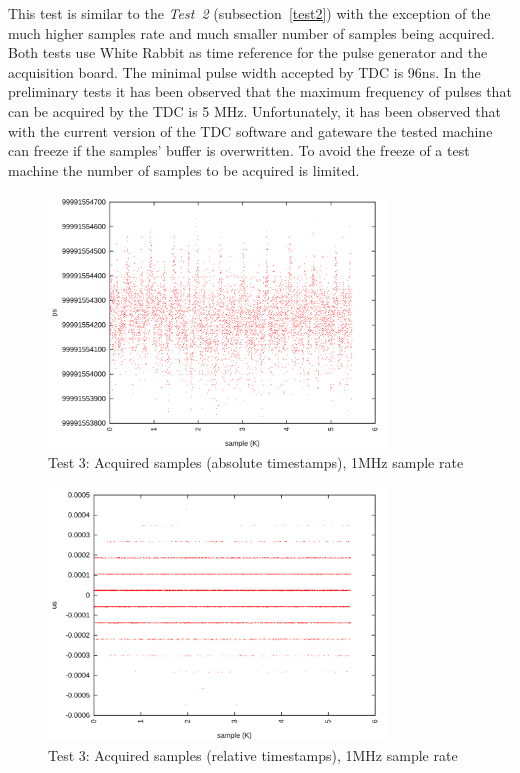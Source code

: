 \documentclass[a4paper, 12pt]{article}
\begin{document}
This test is similar to the \textit{Test~2} (subsection~\ref{test2}) with
the exception of the much higher samples rate and much smaller number of
samples being acquired.
Both tests use White Rabbit as time reference for the pulse generator
and the acquisition board.
The minimal pulse width accepted by TDC is 96ns. In the preliminary tests
it has been observed that the maximum frequency of pulses that can be
acquired by the TDC is 5 MHz. Unfortunately, it has been observed that
with the current version of the TDC software and gateware the tested machine
can freeze if the samples' buffer is overwritten. To avoid the freeze
of a test machine the number of samples to be acquired is limited.

\begin{figure}[ht!]
  \centering
  \includegraphics[width=0.80\textwidth]{img/test3_samples_absolute_1MHz.png}
  \caption{Test 3: Acquired samples (absolute timestamps), 1MHz sample rate}
  \label{test3_absolute_1MHz}
\end{figure}

\begin{figure}[ht!]
  \centering
  \includegraphics[width=0.8\textwidth]{img/test3_samples_relative_1MHz.png}
  \caption{Test 3: Acquired samples (relative timestamps), 1MHz sample rate}
  \label{test3_relative_1MHz}
\end{figure}
\end{document}
